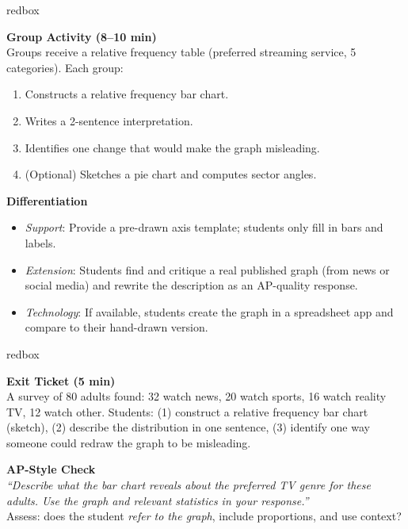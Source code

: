 \documentclass[10pt]{article}
\begin{document}
\begin{skillbox}{redbox}
\begin{minipage}[t]{0.48\linewidth}
    \textbf{Group Activity (8--10 min)}\\
    Groups receive a relative frequency table (preferred streaming service, 5 categories). Each group:
    \begin{enumerate}
        \item Constructs a relative frequency bar chart.
        \item Writes a 2-sentence interpretation.
        \item Identifies one change that would make the graph misleading.
        \item (Optional) Sketches a pie chart and computes sector angles.
    \end{enumerate}
\end{minipage}
\hfill
\begin{minipage}[t]{0.48\linewidth}
    \textbf{Differentiation}
    \begin{itemize}
        \item \textit{Support}: Provide a pre-drawn axis template; students only fill in bars and labels.
        \item \textit{Extension}: Students find and critique a real published graph (from news or social media) and rewrite the description as an AP-quality response.
        \item \textit{Technology}: If available, students create the graph in a spreadsheet app and compare to their hand-drawn version.
    \end{itemize}
\end{minipage}
\end{skillbox}

\begin{skillbox}{redbox}
\begin{minipage}[t]{0.48\linewidth}
    \textbf{Exit Ticket (5 min)}\\
    A survey of 80 adults found: 32 watch news, 20 watch sports, 16 watch reality TV, 12 watch other. Students: (1) construct a relative frequency bar chart (sketch), (2) describe the distribution in one sentence, (3) identify one way someone could redraw the graph to be misleading.
\end{minipage}
\hfill
\begin{minipage}[t]{0.48\linewidth}
    \textbf{AP-Style Check}\\
    \textit{``Describe what the bar chart reveals about the preferred TV genre for these adults. Use the graph and relevant statistics in your response.''}\\[4pt]
    Assess: does the student \textit{refer to the graph}, include proportions, and use context?
\end{minipage}
\end{skillbox}
\end{document}
